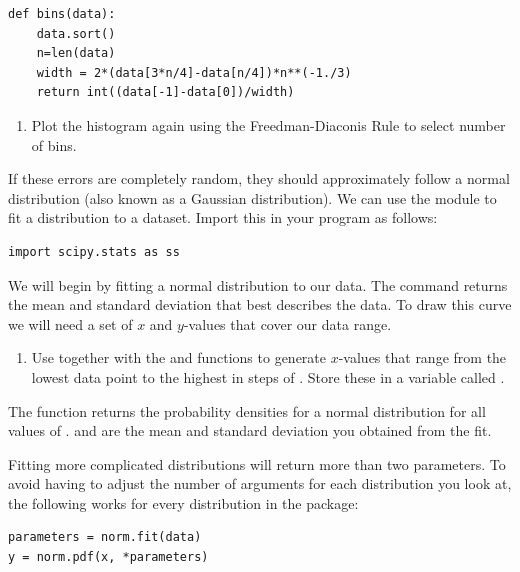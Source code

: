 \documentclass{article}
\begin{document}
\begin{lstlisting}
def bins(data):
    data.sort()
    n=len(data)
    width = 2*(data[3*n/4]-data[n/4])*n**(-1./3)
    return int((data[-1]-data[0])/width)
\end{lstlisting}

\begin{enumerate}[resume]

    \item Plot the histogram again using the Freedman-Diaconis Rule to select number of bins.

\end{enumerate}

If these errors are completely random, they should approximately follow a normal distribution (also known as a Gaussian distribution).
We can use the module  to fit a distribution to a dataset.
Import this in your program as follows:

\begin{lstlisting}
import scipy.stats as ss
\end{lstlisting}

We will begin by fitting a normal distribution to our data.
The command  returns the mean and standard deviation that best describes the data.
To draw this curve we will need a set of $x$ and $y$-values that cover our data range.

\begin{enumerate}[resume]

    \item Use  together with the  and  functions to generate $x$-values that range from the lowest data point to the highest in steps of . Store these in a variable called .

\end{enumerate}

The function  returns the probability densities for a normal distribution for all values of .
 and  are the mean and standard deviation you obtained from the fit.

Fitting more complicated distributions will return more than two parameters.
To avoid having to adjust the number of arguments for each distribution you look at, the following works for every distribution in the  package:

\begin{lstlisting}
parameters = norm.fit(data)
y = norm.pdf(x, *parameters)
\end{lstlisting}
\end{document}
